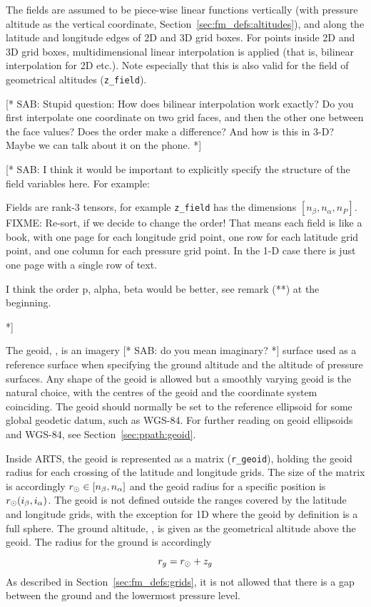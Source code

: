 The fields are assumed to be piece-wise linear functions vertically
(with pressure altitude as the vertical coordinate,
Section~\ref{sec:fm_defs:altitudes}), and along the latitude and
longitude edges of 2D and 3D grid boxes. For points inside 2D and 3D
grid boxes, multidimensional linear interpolation is applied (that is,
bilinear interpolation for 2D etc.). Note especially that this is also
valid for the field of geometrical altitudes (\verb|z_field|).

[* SAB: Stupid question: How does bilinear interpolation work
exactly? Do you first interpolate one coordinate on two grid faces,
and then the other one between the face values? Does the order make a
difference? And how is this in 3-D? Maybe we can talk about it on the
phone. *]

[* SAB: I think it would be important to explicitly specify the
structure of the field variables here. For example:

Fields are rank-3 tensors, for example \verb|z_field| has the
dimensions $[n_\beta,n_\alpha,n_P]$. FIXME: Re-sort, if we decide to
change the order! That means each field is like a book, with one page
for each longitude grid point, one row for each latitude grid point,
and one column for each pressure grid point. In the 1-D case there is
just one page with a single row of text.

I think the order p, alpha, beta would be better, see remark (**) at the
beginning.

*]


\label{sec:fm_defs:geoid}

The geoid, \aRds{\odot}, is an imagery [* SAB: do you mean imaginary?
*] surface used as a reference surface when specifying the ground
altitude and the altitude of pressure surfaces. Any shape of the geoid
is allowed but a smoothly varying geoid is the natural choice, with
the centres of the geoid and the coordinate system coinciding. The
geoid should normally be set to the reference ellipsoid for some
global geodetic datum, such as WGS-84. For further reading on geoid
ellipsoids and WGS-84, see Section~\ref{sec:ppath:geoid}.

Inside ARTS, the geoid is represented as a matrix (\verb|r_geoid|),
holding the geoid radius for each crossing of the latitude and
longitude grids. The size of the matrix is accordingly $r_{\odot}
\in [n_{\beta},n_{\alpha}]$ and the geoid radius for a
specific position is $r_{\odot}(i_{\beta},i_{\alpha})$. The
geoid is not defined outside the ranges covered by the latitude and
longitude grids, with the exception for 1D where the geoid by
definition is a full sphere. 
The ground altitude, , is given as the geometrical altitude
above the geoid. The radius for the ground is accordingly
\begin{equation}
  r_{g} = r_{\odot} + z_{g}
 \label{eq:fm_defs:zground}
\end{equation}
As described in
Section~\ref{sec:fm_defs:grids}, it is not allowed that there is a gap
between the ground and the lowermost pressure level.

